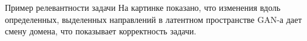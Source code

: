\documentclass[9pt,pdf,hyperref={unicode}]{beamer}
\begin{document}
\begin{frame}{Пример релевантности задачи}
    На картинке показано, что изменения вдоль определенных, выделенных направлений в латентном пространстве GAN-а дает смену домена, что показывает корректность задачи. 
    
    \begin{figure}[h]
        \begin{minipage}[h]{0.59\linewidth}
        \end{minipage}
    \label{heat_maps}
    \end{figure}
    
\end{frame}
\end{document}
